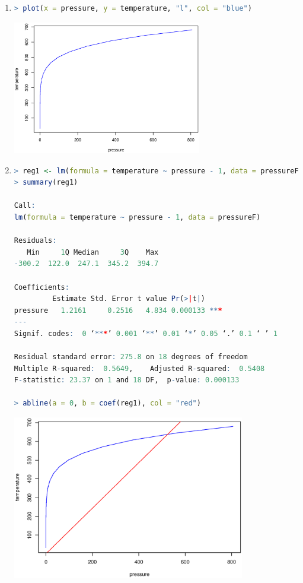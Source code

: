 \documentclass{article}
\begin{document}
\begin{enumerate}[leftmargin = 0 em, label = \arabic*., font = \bfseries]
\begin{enumerate}
\item 
\begin{lstlisting}[language = R]
> plot(x = pressure, y = temperature, "l", col = "blue")
\end{lstlisting}
\begin{center}
\includegraphics[width = 0.65\textwidth]{pressuretemp.eps}
\end{center}

\item 
\begin{lstlisting}[language = R]
> reg1 <- lm(formula = temperature ~ pressure - 1, data = pressureF)
> summary(reg1)

Call:
lm(formula = temperature ~ pressure - 1, data = pressureF)

Residuals:
   Min     1Q Median     3Q    Max 
-300.2  122.0  247.1  345.2  394.7 

Coefficients:
         Estimate Std. Error t value Pr(>|t|)    
pressure   1.2161     0.2516   4.834 0.000133 ***
---
Signif. codes:  0 ‘***’ 0.001 ‘**’ 0.01 ‘*’ 0.05 ‘.’ 0.1 ‘ ’ 1

Residual standard error: 275.8 on 18 degrees of freedom
Multiple R-squared:  0.5649,	Adjusted R-squared:  0.5408 
F-statistic: 23.37 on 1 and 18 DF,  p-value: 0.000133

> abline(a = 0, b = coef(reg1), col = "red")
\end{lstlisting}
\begin{center}
\includegraphics[width = 0.8\textwidth]{reg1.eps}
\end{center}


\end{enumerate}
\end{enumerate}
\end{document}
